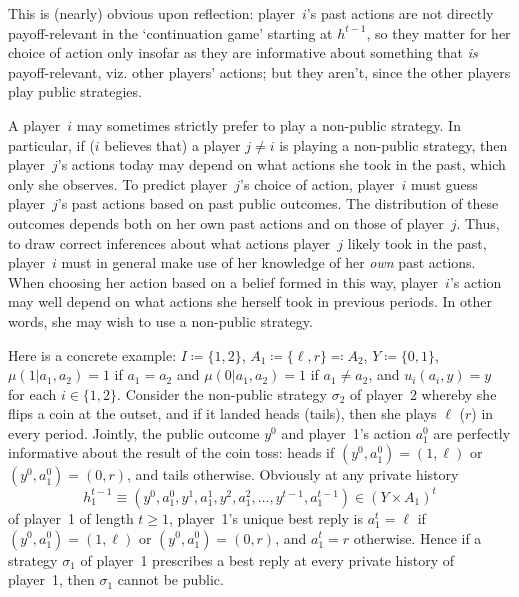 This is (nearly) obvious upon reflection: player~$i$'s past actions are not directly payoff-relevant in the `continuation game' starting at $h^{t-1}$, so they matter for her choice of action only insofar as they are informative about something that \emph{is} payoff-relevant, viz. other players' actions; but they aren't, since the other players play public strategies.

\begin{remark}
	\label{remark:nonpublic_br}
	A player~$i$ may sometimes strictly prefer to play a non-public strategy. In particular, if ($i$ believes that) a player $j \neq i$ is playing a non-public strategy, then player~$j$'s actions today may depend on what actions she took in the past, which only she observes. To predict player~$j$'s choice of action, player~$i$ must guess player~$j$'s past actions based on past public outcomes. The distribution of these outcomes depends both on her own past actions and on those of player~$j$. Thus, to draw correct inferences about what actions player~$j$ likely took in the past, player~$i$ must in general make use of her knowledge of her \emph{own} past actions. When choosing her action based on a belief formed in this way, player~$i$'s action may well depend on what actions she herself took in previous periods. In other words, she may wish to use a non-public strategy.

	Here is a concrete example: $I \coloneqq \{1,2\}$, $A_1 \coloneqq \{\ell,r\} \eqqcolon A_2$, $Y \coloneqq \{0,1\}$, $\mu(1|a_1,a_2) = 1$ if $a_1=a_2$ and $\mu(0|a_1,a_2) = 1$ if $a_1 \neq a_2$, and $u_i(a_i,y) = y$ for each $i \in \{1,2\}$. Consider the non-public strategy $\sigma_2$ of player~2 whereby she flips a coin at the outset, and if it landed heads (tails), then she plays $\ell$ ($r$) in every period. Jointly, the public outcome $y^0$ and player~1's action $a^0_1$ are perfectly informative about the result of the coin toss: heads if $(y^0,a^0_1)=(1,\ell)$ or $(y^0,a^0_1)=(0,r)$, and tails otherwise. Obviously at any private history
	\begin{equation*}
		h^{t-1}_1 \equiv \left(y^0,a^0_1,y^1,a^1_1,y^2,a^2_1,\dots,y^{t-1},a^{t-1}_1\right) \in (Y \times A_1)^t
	\end{equation*}
	of player~1 of length $t \geq 1$, player~1's unique best reply is $a^t_1=\ell$ if $(y^0,a^0_1)=(1,\ell)$ or $(y^0,a^0_1)=(0,r)$, and $a^t_1=r$ otherwise. Hence if a strategy $\sigma_1$ of player~1 prescribes a best reply at every private history of player~1, then $\sigma_1$ cannot be public.


\end{remark}
